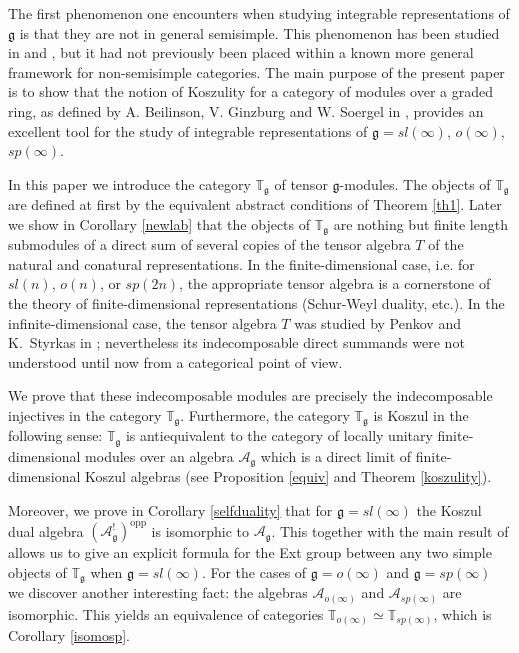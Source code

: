 \documentclass{amsart}
\renewcommand{\sl}{sl}
\newcommand{\so}{o}
\newcommand{\T}{\mathbb T}
\newcommand{\Tg}{\mathbb T_{\mathfrak g}}
\renewcommand{\sp}{sp}
\renewcommand{\gg}{\mathfrak{g}}
\theoremstyle{definition}
\numberwithin{equation}{section}
\begin{document}
The first phenomenon one encounters when studying integrable
representations of $\gg$ is that they are not in general semisimple.
This phenomenon has been studied in \cite{PStyr} and
\cite{PS}, but it had not previously been placed within a known more general framework for non-semisimple categories. 
The main purpose of the present paper is to show that the notion of Koszulity
for a category of modules over a graded ring, as defined by
A. Beilinson, V. Ginzburg and W. Soergel in \cite{BGS}, provides an 
excellent tool for the study of integrable representations of  $\gg=\sl(\infty)$, $\so(\infty)$, $\sp(\infty)$.

In this paper
we introduce the category $\Tg$ of 
tensor $\gg$-modules. The objects of   $\Tg$ are defined at first by the equivalent abstract conditions of Theorem \ref{th1}. Later we show in Corollary
\ref{newlab} that the objects of $\Tg$ are nothing but finite length
submodules of a direct sum of several copies of the tensor algebra $T$
of the natural and conatural representations. In the
finite-dimensional case, i.e. for $\sl(n)$, $\so(n)$, or $\sp(2n)$, the appropriate 
 tensor algebra is a
cornerstone of the theory of finite-dimensional representations (Schur-Weyl duality, etc.).
  In the infinite-dimensional case, the tensor algebra $T$ was studied by Penkov and
K.~Styrkas in \cite{PStyr}; nevertheless its indecomposable direct
summands were not understood until now from a categorical point of
view. 

We prove that these indecomposable modules %
 are precisely
the indecomposable injectives in the category $\Tg$.  Furthermore, the category $\Tg$ is Koszul in the following sense: $\Tg$ is
antiequivalent to the category of locally unitary finite-dimensional
modules over an algebra $\mathcal{A}_\gg$ which is a direct limit of
finite-dimensional Koszul algebras (see Proposition \ref{equiv} and Theorem
\ref{koszulity}). 

Moreover, we prove in Corollary \ref{selfduality} that for $\gg=\sl(\infty)$ 
the Koszul dual algebra $(\mathcal{A}_\gg^!)^\mathrm{opp}$ is 
isomorphic to $\mathcal{A}_\gg$. This together with the main result of \cite{PStyr} allows us to give
an explicit formula for the Ext group between any two simple objects of $\Tg$ when
$\gg=\sl(\infty)$.
For the cases of  $\gg=\so(\infty)$ and $\gg=\sp(\infty)$ we discover
another interesting fact:
the algebras $\mathcal{A}_{\so(\infty)}$ and
$\mathcal{A}_{\sp(\infty)}$ are isomorphic. This yields an 
equivalence of categories $\T_{\so(\infty)}\simeq \T_{\sp(\infty)}$, which is
Corollary \ref{isomosp}. 
\end{document}
